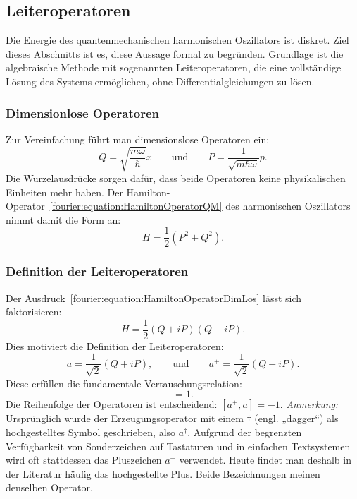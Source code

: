 	\subsection{Leiteroperatoren\label{fourier:subsection:Leiteroperatoren}}
		Die Energie des quantenmechanischen harmonischen Oszillators ist diskret.
		Ziel dieses Abschnitts ist es, diese Aussage formal zu begründen.
		Grundlage ist die algebraische Methode mit sogenannten Leiteroperatoren, die eine vollständige Lösung des Systems ermöglichen, ohne Differentialgleichungen zu lösen.	

		\subsubsection{Dimensionlose Operatoren\label{fourier:subsubsection:DimensionsloseOperatoren}}
			Zur Vereinfachung führt man dimensionslose Operatoren ein:
			\[
				Q = \sqrt{\frac{m\omega}{\hbar}}x
				\qquad\text{und}\qquad
				P = \frac{1}{\sqrt{m\hbar\omega}}p.
			\]
			Die Wurzelausdrücke sorgen dafür, dass beide Operatoren keine physikalischen Einheiten mehr haben.
			Der Hamilton-Operator~\ref{fourier:equation:HamiltonOperatorQM} des harmonischen Oszillators nimmt damit die Form an:
			\begin{equation}\label{fourier:equation:HamiltonOperatorDimLos}
				H = \frac{1}{2}(P^2 + Q^2).
			\end{equation}

		\subsubsection{Definition der Leiteroperatoren\label{fourier:subsubsection:DefinitionLeiteroperatoren}}
			Der Ausdruck~\ref{fourier:equation:HamiltonOperatorDimLos} lässt sich faktorisieren:
			\[
				H = \frac{1}{2}(Q + iP)(Q - iP).
			\]
			Dies motiviert die Definition der Leiteroperatoren:
			\begin{equation}
				a = \frac{1}{\sqrt{2}}(Q + iP),
				\qquad\text{und}\qquad
				a^+ = \frac{1}{\sqrt{2}}(Q - iP).
			\end{equation}
			Diese erfüllen die fundamentale Vertauschungsrelation:
			\begin{equation}
				[a, a^+] = 1.
			\end{equation}
			Die Reihenfolge der Operatoren ist entscheidend: $[a^+, a] = -1$.
			\textit{Anmerkung:}
			Ursprünglich wurde der Erzeugungsoperator mit einem $\dagger$ (engl. „dagger“) als hochgestelltes Symbol geschrieben, also $a^\dagger$.
			Aufgrund der begrenzten Verfügbarkeit von Sonderzeichen auf Tastaturen und in einfachen Textsystemen wird oft stattdessen das Pluszeichen $a^+$ verwendet.
			Heute findet man deshalb in der Literatur häufig das hochgestellte Plus.
			Beide Bezeichnungen meinen denselben Operator.

